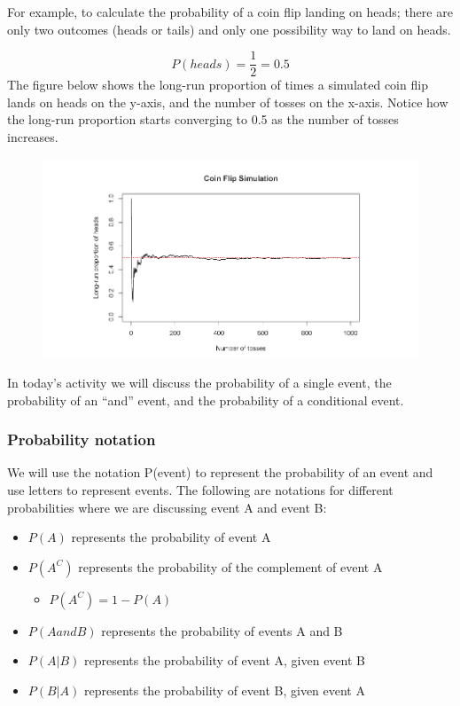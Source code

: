 \documentclass[
]{report}
\providecommand{\tightlist}{%
  \setlength{\itemsep}{0pt}\setlength{\parskip}{0pt}}
\begin{document}
For example, to calculate the probability of a coin flip landing on heads; there are only two outcomes (heads or tails) and only one possibility way to land on heads.

\[P(heads) = \frac{1}{2} = 0.5\]
The figure below shows the long-run proportion of times a simulated coin flip lands on heads on the y-axis, and the number of tosses on the x-axis. Notice how the long-run proportion starts converging to 0.5 as the number of tosses increases.

\begin{figure}

{\centering \includegraphics[width=0.65\linewidth]{images/coinsim} 

}

\end{figure}

In today's activity we will discuss the probability of a single event, the probability of an ``and'' event, and the probability of a conditional event.

\subsubsection*{Probability notation}\label{probability-notation}

We will use the notation P(event) to represent the probability of an event and use letters to represent events. The following are notations for different probabilities where we are discussing event A and event B:

\begin{itemize}
\item
  \(P(A)\) represents the probability of event A
\item
  \(P(A^C)\) represents the probability of the complement of event A

  \begin{itemize}
  \tightlist
  \item
    \(P(A^C) = 1 - P(A)\)
  \end{itemize}
\item
  \(P(A and B)\) represents the probability of events A and B
\item
  \(P(A|B)\) represents the probability of event A, given event B
\item
  \(P(B|A)\) represents the probability of event B, given event A
\end{itemize}
\end{document}
